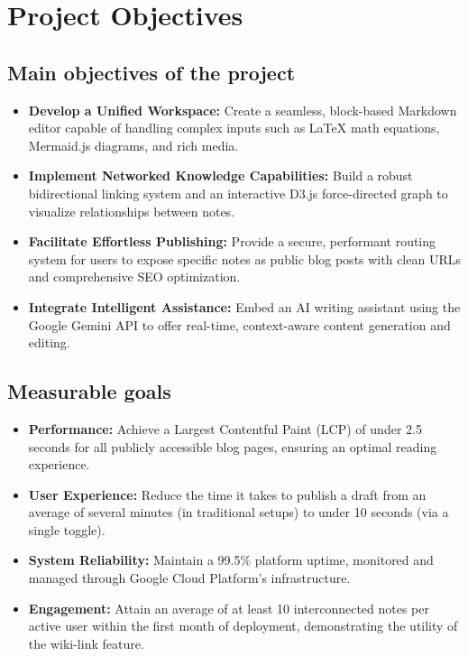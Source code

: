 \documentclass[12pt, a4paper]{article}
\begin{document}
\section{Project Objectives}

\subsection{Main objectives of the project}
\begin{itemize}[leftmargin=2em]
    \item \textbf{Develop a Unified Workspace:} Create a seamless, block-based Markdown editor capable of handling complex inputs such as LaTeX math equations, Mermaid.js diagrams, and rich media.
    \item \textbf{Implement Networked Knowledge Capabilities:} Build a robust bidirectional linking system and an interactive D3.js force-directed graph to visualize relationships between notes.
    \item \textbf{Facilitate Effortless Publishing:} Provide a secure, performant routing system for users to expose specific notes as public blog posts with clean URLs and comprehensive SEO optimization.
    \item \textbf{Integrate Intelligent Assistance:} Embed an AI writing assistant using the Google Gemini API to offer real-time, context-aware content generation and editing.
\end{itemize}

\subsection{Measurable goals}
\begin{itemize}[leftmargin=2em]
    \item \textbf{Performance:} Achieve a Largest Contentful Paint (LCP) of under 2.5 seconds for all publicly accessible blog pages, ensuring an optimal reading experience.
    \item \textbf{User Experience:} Reduce the time it takes to publish a draft from an average of several minutes (in traditional setups) to under 10 seconds (via a single toggle).
    \item \textbf{System Reliability:} Maintain a 99.5\% platform uptime, monitored and managed through Google Cloud Platform's infrastructure.
    \item \textbf{Engagement:} Attain an average of at least 10 interconnected notes per active user within the first month of deployment, demonstrating the utility of the wiki-link feature.
\end{itemize}
\end{document}
